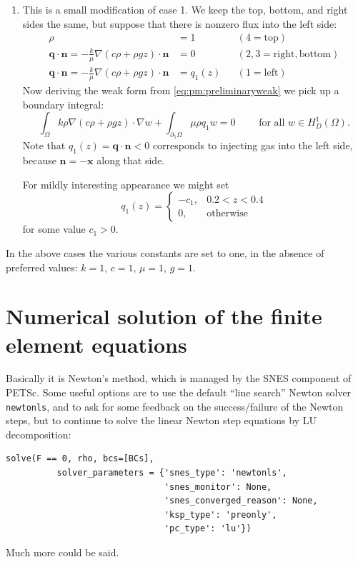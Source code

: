 \documentclass[11pt]{amsart}
\newcommand{\bn}{\mathbf{n}}
\newcommand{\bq}{\mathbf{q}}
\newcommand{\bx}{\mathbf{x}}
\newcommand{\grad}{\nabla}
\begin{document}
\begin{enumerate}
\item This is a small modification of case 1.  We keep the top, bottom, and right sides the same, but suppose that there is nonzero flux into the left side:
\begin{subequations}
\begin{align}
\rho &= 1 & &(4=\text{top}) \label{eq:twobc:dirichlet} \\
\bq \cdot \bn = - \frac{k}{\mu} \grad(c\rho + \rho g z) \cdot \bn &= 0 & &(2,3=\text{right},\text{bottom}) \label{eq:twobc:noflux} \\
\bq \cdot \bn = - \frac{k}{\mu} \grad(c\rho + \rho g z) \cdot \bn &= q_1(z) & &(1=\text{left}) \label{eq:twobc:givenflux}
\end{align}
\end{subequations}
Now deriving the weak form from \eqref{eq:pm:preliminaryweak} we pick up a boundary integral:
\begin{equation}
\int_\Omega k \rho \grad\left(c\rho + \rho g z\right) \cdot \grad w + \int_{\partial_1\Omega} \mu \rho q_1 w = 0 \qquad \text{ for all } w \in H_D^1(\Omega).\label{eq:pm:weaktwo}
\end{equation}
Note that $q_1(z) = \bq \cdot \bn < 0$ corresponds to injecting gas into the left side, because $\bn = -\bx$ along that side.

For mildly interesting appearance we might set
	$$q_1(z) = \begin{cases} -c_1, & 0.2 < z < 0.4 \\ 0, & \text{otherwise} \end{cases}$$
for some value $c_1>0$.
\end{enumerate}

In the above cases the various constants are set to one, in the absence of preferred values: $k=1$, $c=1$, $\mu=1$, $g=1$.



\section{Numerical solution of the finite element equations}

Basically it is Newton's method, which is managed by the SNES component of PETSc.  Some useful options are to use the default ``line search'' Newton solver \texttt{newtonls}, and to ask for some feedback on the success/failure of the Newton steps, but to continue to solve the linear Newton step equations by LU decomposition:
\begin{Verbatim}[fontsize=\small]
    solve(F == 0, rho, bcs=[BCs],
          solver_parameters = {'snes_type': 'newtonls',
                               'snes_monitor': None,
                               'snes_converged_reason': None,
                               'ksp_type': 'preonly',
                               'pc_type': 'lu'})
\end{Verbatim}
Much more could be said.
\end{document}

